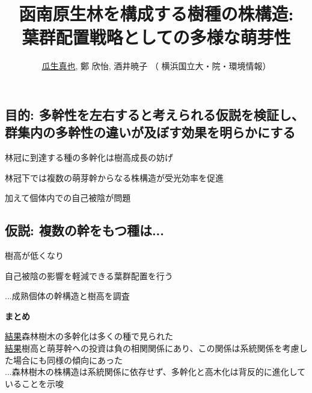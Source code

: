 \documentclass[a0, 36pt, plainboxedsections]{sciposter} %
\title{\textcolor{Orange1}{函南原生林を構成する樹種の株構造:\\葉群配置戦略としての多様な萌芽性}}
\author{\faUser \hspace{0.02em} \underline{瓜生真也}, 鄭 欣怡, 酒井暁子 （\faUniv \hspace{0.02em} 横浜国立大・院・環境情報） \normalsize{\faEnvelope \hspace{0.02em} \fontspec{ComicSansMS}{suika1127@gmail.com}}}
\begin{document}
\maketitle
\vspace{-2em}
\begin{multicols}{2}
\begin{mdframed}[style=section.frame]
  \centering\huge\textbf{}
\end{mdframed}

\subsection*{目的: 多幹性を左右すると考えられる仮説を検証し、群集内の多幹性の違いが及ぼす効果を明らかにする} %

林冠に到達する種の多幹化は樹高成長の妨げ

林冠下では複数の萌芽幹からなる株構造が受光効率を促進

加えて個体内での自己被陰が問題

\subsection*{仮説: 複数の幹をもつ種は...}

\begin{list}{}{\setlength{\itemindent}{1em}} %
 \item 樹高が低くなり
 \item 自己被陰の影響を軽減できる葉群配置を行う
\end{list}

...成熟個体の幹構造と樹高を調査

\columnbreak
\begin{mdframed}[style=conclusion.frame]
  \centering\huge\textbf{\faFlagAlt \vspace{0.02em} まとめ}
  \flushleft\normalsize{
  
  \underline{結果}森林樹木の多幹化は多くの種で見られた\\
  \underline{結果}樹高と萌芽幹への投資は負の相関関係にあり、この関係は系統関係を考慮した場合にも同様の傾向にあった\\
  ...森林樹木の株構造は系統関係に依存せず、多幹化と高木化は背反的に進化していることを示唆
  
}
\end{mdframed}
\end{multicols}
\end{document}
